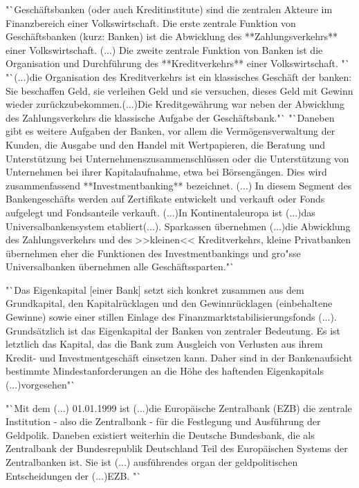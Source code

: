\documentclass[
        onecolumn,
        a4paper,
        abstracton,
        parskip=half
        ,final
        ]{scrartcl}
\begin{document}
    \citep*[vgl.][S.512-13]{Basseler2010} "`Gesch{\"a}ftsbanken (oder auch Kreditinstitute) sind die zentralen Akteure im Finanzbereich einer Volkswirtschaft. Die erste zentrale Funktion von Gesch{\"a}ftsbanken (kurz: Banken) ist die Abwicklung des **Zahlungsverkehrs** einer Volkswirtschaft. (...) Die zweite zentrale Funktion von Banken ist die Organisation und Durchf{\"u}hrung des **Kreditverkehrs** einer Volkswirtschaft. "`
    "`(...)die Organisation des Kreditverkehrs ist ein klassisches Gesch{\"a}ft der banken: Sie beschaffen Geld, sie verleihen Geld und sie versuchen, dieses Geld mit Gewinn wieder zur{\"u}ckzubekommen.(...)Die Kreditgew{\"a}hrung war neben der Abwicklung des Zahlungsverkehrs die klassische Aufgabe der Gesch{\"a}ftsbank."`
     "`Daneben gibt es weitere Aufgaben der Banken, vor allem die Verm{\"o}gensverwaltung der Kunden, die Ausgabe und den Handel mit Wertpapieren, die Beratung und Unterst{\"u}tzung bei Unternehmenszusammenschl{\"u}ssen oder die Unterst{\"u}tzung von Unternehmen bei ihrer Kapitalaufnahme, etwa bei B{\"o}rseng{\"a}ngen. Dies wird zusammenfassend **Investmentbanking** bezeichnet. (...) In diesem Segment des Bankengesch{\"a}fts  werden auf Zertifikate entwickelt und verkauft oder Fonds aufgelegt und Fondsanteile verkauft. (...)In Kontinentaleuropa ist (...)das Universalbankensystem etabliert(...). Sparkassen {\"u}bernehmen (...)die Abwicklung des Zahlungsverkehrs und des >>kleinen<< Kreditverkehrs, kleine Privatbanken {\"u}bernehmen eher die Funktionen des Investmentbankings und gro{"ss}e Universalbanken {\"u}bernehmen alle Gesch{\"a}ftssparten."`

    \citep*[vgl.][S.515]{Basseler2010} "`Das Eigenkapital [einer Bank] setzt sich konkret zusammen aus dem Grundkapital, den Kapitalr{\"u}cklagen und den Gewinnr{\"u}cklagen (einbehaltene Gewinne) sowie einer stillen Einlage des Finanzmarktstabilisierungsfonds (...). Grunds{\"a}tzlich ist das Eigenkapital der Banken von zentraler Bedeutung. Es ist letztlich das Kapital, das die Bank zum Ausgleich von Verlusten aus ihrem Kredit- und Investmentgesch{\"a}ft einsetzen kann.  Daher sind in der Bankenaufsicht bestimmte Mindestanforderungen an die H{\"o}he des haftenden Eigenkapitals (...)vorgesehen"`

    \citep*[vgl.][S.512]{Basseler2010}  "`Mit dem (...) 01.01.1999 ist (...)die Europ{\"a}ische Zentralbank (EZB) die zentrale Institution - also die Zentralbank - f{\"u}r die Festlegung und Ausf{\"u}hrung der Geldpolik. Daneben existiert weiterhin die Deutsche Bundesbank, die als Zentralbank der Bundesrepublik Deutschland Teil des Europ{\"a}ischen Systems der Zentralbanken ist. Sie ist (...) ausf{\"u}hrendes organ der geldpolitischen Entscheidungen der (...)EZB. "`
    \clearpage
\end{document}
